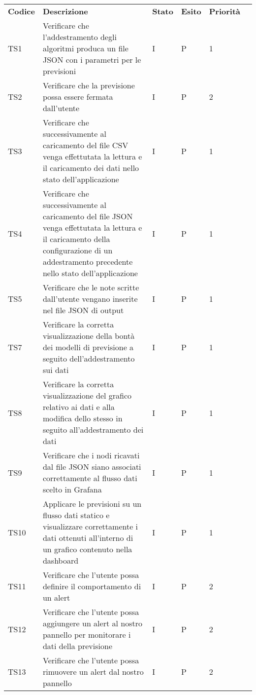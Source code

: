 \begin{longtable} {
	>{}p{12mm}
	>{}p{79.5mm}
	>{}p{9mm}
	>{}p{8mm}
	>{}p{14mm}
	>{}p{0mm}}
	\rowcolor{gray!50}
	\textbf{Codice} & \textbf{Descrizione} & \textbf{Stato} & \textbf{Esito} & \textbf{Priorità} & \TBstrut \\
	TS1 & Verificare che l'addestramento degli algoritmi produca un file JSON con i parametri per le previsioni & I & P & 1 & \TBstrut \\ [2mm]
	TS2 & Verificare che la previsione possa essere fermata dall'utente & I & P & 2 & \TBstrut \\ [2mm]
	TS3 & Verificare che successivamente al caricamento del file CSV venga effettutata la lettura e il caricamento dei dati nello stato dell'applicazione & I & P & 1 & \TBstrut \\ [2mm]
	TS4 & Verificare che successivamente al caricamento del file JSON venga effettutata la lettura e il caricamento della configurazione di un addestramento precedente nello stato dell'applicazione & I & P & 1 & \TBstrut \\ [2mm]
	TS5 & Verificare che le note scritte dall'utente vengano inserite nel file JSON di output & I & P & 1 & \TBstrut \\ [2mm]
	TS7 & Verificare la corretta visualizzazione della bontà dei modelli di previsione a seguito dell'addestramento sui dati & I & P & 1 & \TBstrut \\ [2mm]
	TS8 & Verificare la corretta visualizzazione del grafico relativo ai dati e alla modifica dello stesso in seguito all'addestramento dei dati & I & P & 1 & \TBstrut \\ [2mm]
	TS9 & Verificare che i nodi ricavati dal file JSON siano associati correttamente al flusso dati scelto in Grafana\glo & I & P & 1 & \TBstrut \\ [2mm]
	TS10 & Applicare le previsioni su un flusso dati statico e visualizzare correttamente i dati ottenuti all'interno di un grafico contenuto nella dashboard\glo & I & P & 1 & \TBstrut \\ [2mm]
	TS11 & Verificare che l'utente possa definire il comportamento di un alert & I & P & 2 & \TBstrut \\ [2mm]
	TS12 & Verificare che l'utente possa aggiungere un alert al nostro pannello per monitorare i dati della previsione & I & P & 2 & \TBstrut \\ [2mm]
	TS13 & Verificare che l'utente possa rimuovere un alert dal nostro pannello & I & P & 2 & \TBstrut \\ [2mm]

\end{longtable}
